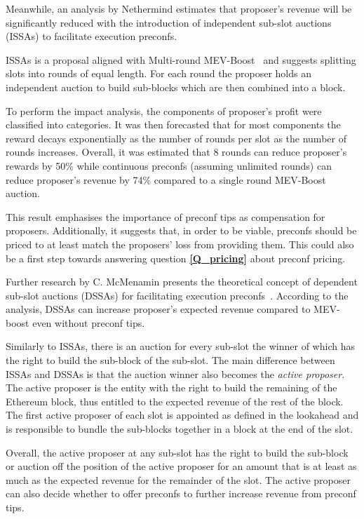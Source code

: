 \documentclass[conference]{IEEEtran}
\theoremstyle{boldstyle}
\begin{document}
    Meanwhile, an analysis by Nethermind \cite{W:EstimatingtheRevenuefromIndependentSub-SlotAuctionPreconfirmations} estimates that proposer's revenue will be significantly reduced with the introduction of independent sub-slot auctions (ISSAs) to facilitate execution preconfs.
        
    ISSAs is a proposal aligned with Multi-round MEV-Boost~\cite{W:BasedPreconfirmationswithMulti-roundMEV-Boost} and suggests splitting slots into rounds of equal length. For each round the proposer holds an independent auction to build sub-blocks which are then combined into a block.

    To perform the impact analysis, the components of proposer's profit were classified into categories. It was then forecasted that for most components the reward decays exponentially as the number of rounds per slot as the number of rounds increases. Overall, it was estimated that 8 rounds can reduce proposer's rewards by 50\% while continuous preconfs (assuming unlimited rounds) can reduce proposer's revenue by 74\% compared to a single round MEV-Boost auction.

    This result emphasises the importance of preconf tips as compensation for proposers. Additionally, it suggests that, in order to be viable, preconfs should be priced to at least match the proposers' loss from providing them. This could also be a first step towards answering question \textbf{\ref{Q_pricing}} about preconf pricing.
    
    Further research by C. McMenamin presents the theoretical concept of dependent sub-slot auctions (DSSAs) for facilitating execution preconfs~\cite{W:AnalysingExpectedProposerRevenuefromPreconfirmations}. According to the analysis, DSSAs can increase proposer's expected revenue compared to MEV-boost even without preconf tips.

    Similarly to ISSAs, there is an auction for every sub-slot the winner of which has the right to build the sub-block of the sub-slot. The main difference between ISSAs and DSSAs is that the auction winner also becomes the \textit{active proposer}. The active proposer is the entity with the right to build the remaining of the Ethereum block, thus entitled to the expected revenue of the rest of the block. The first active proposer of each slot is appointed as defined in the lookahead and is responsible to bundle the sub-blocks together in a block at the end of the slot.

    Overall, the active proposer at any sub-slot has the right to build the sub-block or auction off the position of the active proposer for an amount that is at least as much as the expected revenue for the remainder of the slot. The active proposer can also decide whether to offer preconfs to further increase revenue from preconf tips.
\end{document}

